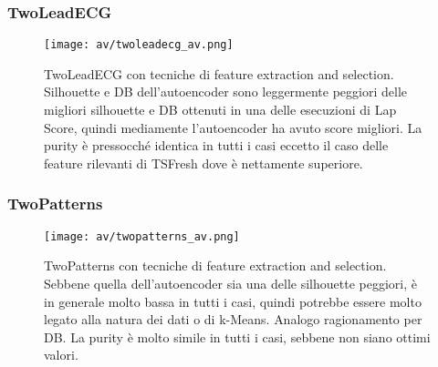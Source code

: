 \subsubsection{TwoLeadECG}
\begin{figure}[H]
	\centering
	\texttt{[image: av/twoleadecg\_av.png]}
	\caption{TwoLeadECG con tecniche di feature extraction and selection. Silhouette e DB dell'autoencoder sono leggermente peggiori delle migliori silhouette e DB ottenuti in una delle esecuzioni di Lap Score, quindi mediamente l'autoencoder ha avuto score migliori. La purity è pressocché identica in tutti i casi eccetto il caso delle feature rilevanti di TSFresh dove è nettamente superiore.}
	\label{fig:twoleadecg_av}
\end{figure}

\subsubsection{TwoPatterns}
\begin{figure}[H]
	\centering
	\texttt{[image: av/twopatterns\_av.png]}
	\caption{TwoPatterns con tecniche di feature extraction and selection. Sebbene quella dell'autoencoder sia una delle silhouette peggiori, è in generale molto bassa in tutti i casi, quindi potrebbe essere molto legato alla natura dei dati o di k-Means. Analogo ragionamento per DB. La purity è molto simile in tutti i casi, sebbene non siano ottimi valori.}
	\label{fig:twopatterns_av}
\end{figure}